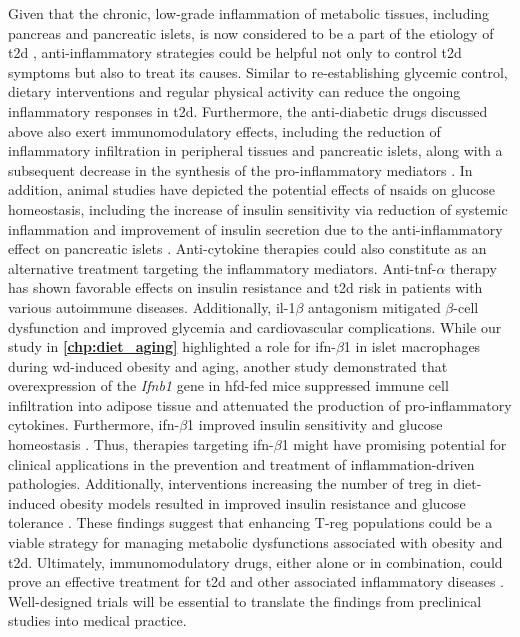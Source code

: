 \par Given that the chronic, low-grade inflammation of metabolic tissues, including pancreas and pancreatic islets, is now considered to be a part of the etiology of \gls{t2d} \textbf{\cite{cuenco_islet_2022}}, anti-inflammatory strategies could be helpful not only to control \gls{t2d} symptoms but also to treat its causes. Similar to re-establishing glycemic control, dietary interventions and regular physical activity can reduce the ongoing inflammatory responses in \gls{t2d}. Furthermore, the anti-diabetic drugs discussed above also exert immunomodulatory effects, including the reduction of inflammatory infiltration in peripheral tissues and pancreatic islets, along with a subsequent decrease in the synthesis of the pro-inflammatory mediators \textbf{\cite{kurylowicz_anti-inflammatory_2020}}. In addition, animal studies have depicted the potential effects of \glspl{nsaid} on glucose homeostasis, including the increase of insulin sensitivity via reduction of systemic inflammation and improvement of insulin secretion due to the anti-inflammatory effect on pancreatic islets \textbf{\cite{kurylowicz_anti-inflammatory_2020}}. Anti-cytokine therapies could also constitute as an alternative treatment targeting the inflammatory mediators. Anti-\gls{tnf}-$\alpha$ therapy has shown favorable effects on insulin resistance and \gls{t2d} risk in patients with various autoimmune diseases. Additionally, \gls{il}-1$\beta$ antagonism mitigated $\beta$-cell dysfunction and improved glycemia and cardiovascular complications. While our study in \textbf{\autoref{chp:diet_aging}} highlighted a role for \gls{ifn}-$\beta$1 in islet macrophages during \gls{wd}-induced obesity and aging, another study demonstrated that overexpression of the \textit{Ifnb1} gene in \gls{hfd}-fed mice suppressed immune cell infiltration into adipose tissue and attenuated the production of pro-inflammatory cytokines. Furthermore, \gls{ifn}-$\beta$1 improved insulin sensitivity and glucose homeostasis \textbf{\cite{alsaggar_interferon_2017}}. Thus, therapies targeting \gls{ifn}-$\beta$1 might have promising potential for clinical applications in the prevention and treatment of inflammation-driven pathologies. Additionally, interventions increasing the number of \gls{treg} in diet-induced obesity models resulted in improved insulin resistance and glucose tolerance \textbf{\cite{winer_normalization_2009,feuerer_lean_2009}}. These findings suggest that enhancing T-reg populations could be a viable strategy for managing metabolic dysfunctions associated with obesity and \gls{t2d}. Ultimately, immunomodulatory drugs, either alone or in combination, could prove an effective treatment for \gls{t2d} and other associated inflammatory diseases \textbf{\cite{rohm_inflammation_2022}}. Well-designed trials will be essential to translate the findings from preclinical studies into medical practice.\\

